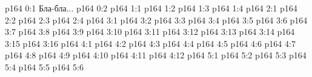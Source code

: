 \author{Промежуточные создания}
\vs p164 0:1  Бла-бла...
\vs p164 0:2 
\vs p164 1:1 
\vs p164 1:2 
\vs p164 1:3 
\vs p164 1:4 
\vs p164 2:1 
\vs p164 2:2 
\vs p164 2:3 
\vs p164 2:4 
\vs p164 3:1 
\vs p164 3:2 
\vs p164 3:3 \pc 
\vs p164 3:4 
\vs p164 3:5 
\vs p164 3:6 \pc 
\vs p164 3:7 
\vs p164 3:8 
\vs p164 3:9 
\vs p164 3:10 
\vs p164 3:11 \pc 
\vs p164 3:12 
\vs p164 3:13 
\vs p164 3:14 
\vs p164 3:15 
\vs p164 3:16 \pc 
{}
\vs p164 4:1 
\vs p164 4:2 
\vs p164 4:3 
\vs p164 4:4 
\vs p164 4:5 
\vs p164 4:6 
\vs p164 4:7 
\vs p164 4:8 
\vs p164 4:9 
\vs p164 4:10 
\vs p164 4:11 
\vs p164 4:12 
\vs p164 5:1 
\vs p164 5:2 
\vs p164 5:3 
\vs p164 5:4 
\vs p164 5:5 
\vs p164 5:6 
\quizlink
